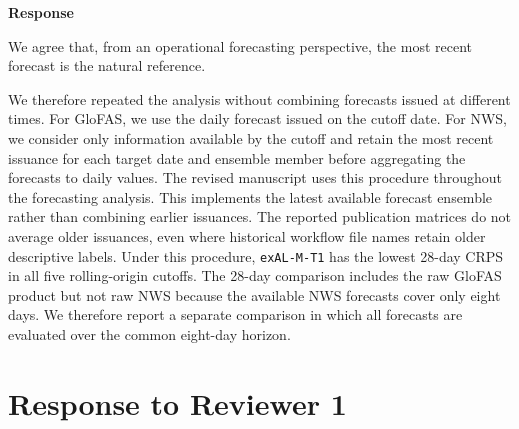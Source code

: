 \documentclass[11pt,letterpaper]{article}
\newcommand{\responseheading}{%
  \vspace{2pt}\noindent\textbf{Response}\par
}
\newenvironment{responsebox}{\begin{mdframed}[style=plainbox]}{\end{mdframed}}
\begin{document}
\responseheading
\begin{responsebox}
We agree that, from an operational forecasting perspective, the most recent forecast is the natural reference.

We therefore repeated the analysis without combining forecasts issued at different times. For GloFAS, we use the daily forecast issued on the cutoff date. For NWS, we consider only information available by the cutoff and retain the most recent issuance for each target date and ensemble member before aggregating the forecasts to daily values. The revised manuscript uses this procedure throughout the forecasting analysis.
This implements the latest available forecast ensemble rather than combining earlier issuances. The reported publication matrices do not average older issuances, even where historical workflow file names retain older descriptive labels. Under this procedure, \texttt{exAL-M-T1} has the lowest 28-day CRPS in all five rolling-origin cutoffs. The 28-day comparison includes the raw GloFAS product but not raw NWS because the available NWS forecasts cover only eight days. We therefore report a separate comparison in which all forecasts are evaluated
over the common eight-day horizon.

\end{responsebox}


\section{Response to Reviewer 1}
\end{document}
